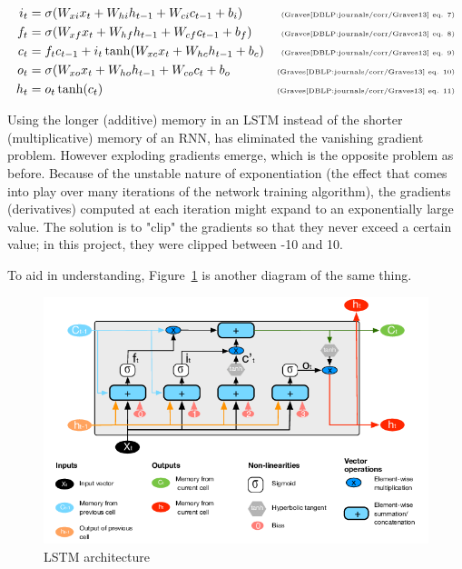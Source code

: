 \documentclass{article}
\begin{document}
    \begin{align}
        \label{eqn:gr7} i_t &= \sigma(W_{xi}x_t+W_{hi}h_{t-1}+W_{ci}c_{t-1}+b_i) & \text{\tiny{(Graves\cite{DBLP:journals/corr/Graves13} eq. 7)}} \\
        \label{eqn:gr8} f_t &= \sigma(W_{xf}x_t+W_{hf}h_{t-1}+W_{cf}c_{t-1}+b_f) & \text{\tiny{(Graves\cite{DBLP:journals/corr/Graves13} eq. 8)}} \\
        \label{eqn:gr9} c_t &= f_tc_{t-1}+i_t\tanh(W_{xc}x_t+W_{hc}h_{t-1}+b_c) & \text{\tiny{(Graves\cite{DBLP:journals/corr/Graves13} eq. 9)}} \\
        \label{eqn:gr10} o_t &= \sigma(W_{xo}x_t+W_{ho}h_{t-1}+W_{co}c_{t}+b_o & \text{\tiny{(Graves\cite{DBLP:journals/corr/Graves13} eq. 10)}} \\
        \label{eqn:gr11} h_t &= o_t\tanh(c_t) & \text{\tiny{(Graves\cite{DBLP:journals/corr/Graves13} eq. 11)}}
    \end{align}    
    
Using the longer (additive) memory in an LSTM instead of the shorter (multiplicative) memory of an RNN, has eliminated the vanishing gradient problem. However exploding gradients emerge, which is the opposite problem as before. Because of the unstable nature of exponentiation (the effect that comes into play over many iterations of the network training algorithm), the gradients (derivatives) computed at each iteration might expand to an exponentially large value. The solution is to "clip" the gradients so that they never exceed a certain value; in this project, they were clipped between -10 and 10.

To aid in understanding, Figure~\ref{fig:lstm} is another diagram of the same thing.
    
    \begin{figure}[hbt!]
        \includegraphics[width=12cm]{graphics/LSTM-Arch.png}
        \centering
        \caption{LSTM architecture \cite{inproceedings}}
        \label{fig:lstm}
    \end{figure}    
    
\end{document}
